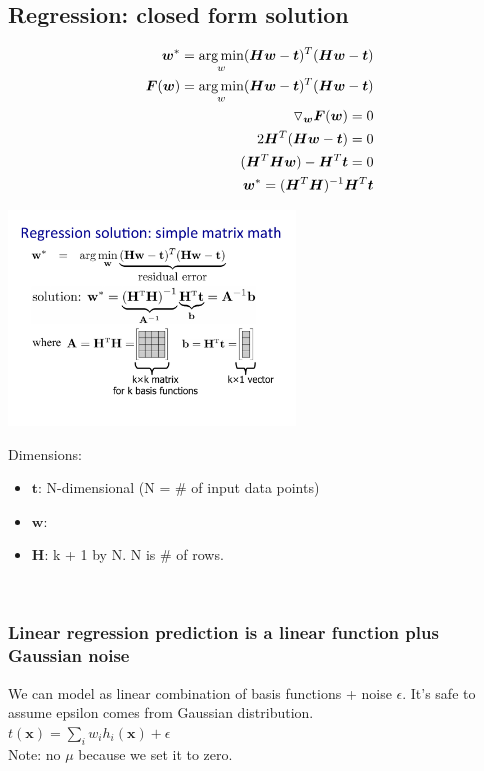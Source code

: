 \subsection{Regression: closed form solution}
\begin{align*}
	\bm{w}^* = \operatorname*{arg\,min}_w (\bm{Hw} -\bm{t})^T (\bm{Hw} -\bm{t})  & \\
	\bm{F}(\bm{w}) =  \operatorname*{arg\,min}_w (\bm{Hw} -\bm{t})^T (\bm{Hw} -\bm{t}) & \\
	\triangledown_{\bm{w}}\bm{F}(\bm{w}) = 0 \\
	2 \bm{H}^T (\bm{H}\bm{w}-\bm{t}) = 0  & \\
	(\bm{H}^T\bm{H}\bm{w}) - \bm{H}^T\bm{t} = 0 & \\
	\bm{w}^* = (\bm{H}^T\bm{H})^{-1}\bm{H}^T\bm{t} &
\end{align*}

\includegraphics[width=3in]{figures/Regression_matrix_math.pdf}

Dimensions: 
\begin{itemize}
	\item $\bm{t}$:  N-dimensional  (N = \# of input data points) 
	\item $\bm{w}$: 
	\item $\bm{H}$: k + 1 by N.  N is \# of rows. 
\end{itemize}
\hfill \\

\subsubsection{Linear regression prediction is a linear function plus Gaussian noise}
We can model as linear combination of basis functions + noise $\epsilon$.  
It's safe to assume epsilon comes from Gaussian distribution.  \hfill \\

$t(\bm{x}) = \sum_i w_i h_i(\bm{x}) + \epsilon $ \hfill \\
Note: no $\mu$ because we set it to zero.  \hfill \\

